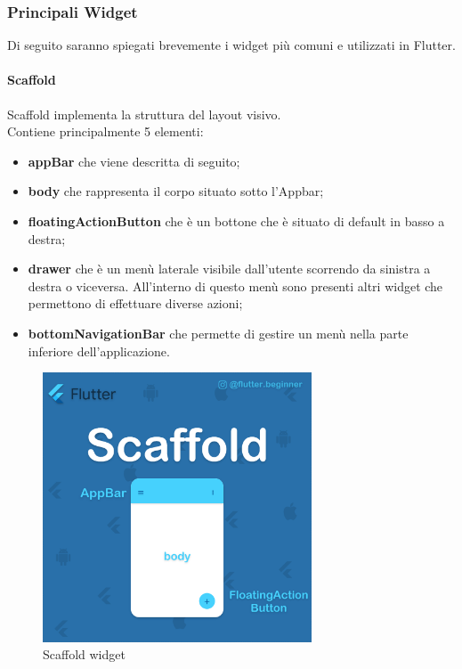 \newpage

\subsubsection{Principali Widget}
Di seguito saranno spiegati brevemente i widget più comuni e utilizzati in Flutter.

\paragraph{Scaffold}
Scaffold implementa la struttura del layout visivo.\\
Contiene principalmente 5 elementi:
\begin{itemize}
	\item \textbf{appBar} che viene descritta di seguito;   
	\item \textbf{body} che rappresenta il corpo situato sotto l'Appbar;
	\item \textbf{floatingActionButton} che è un bottone che è situato di default in basso a destra;   
	\item \textbf{drawer} che è un menù laterale visibile dall'utente scorrendo da sinistra a destra o viceversa. All'interno di questo menù sono presenti altri widget che permettono di effettuare diverse azioni;
	\item \textbf{bottomNavigationBar} che permette di gestire un menù nella parte inferiore dell'applicazione.
\end{itemize}

\begin{figure}[htbp]	
	\centering
	\includegraphics[width=8cm]{immagini/scaffold.png}
	\caption{Scaffold widget}
	\label{fig:Scaffold widget}
\end{figure}

